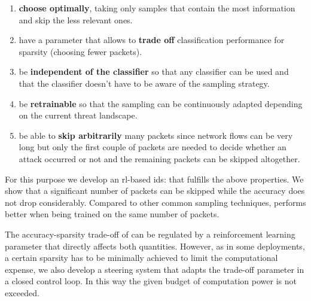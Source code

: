 \documentclass[conference]{IEEEtran}
\begin{document}
\begin{enumerate}
\item \textbf{choose optimally}, taking only samples that contain the most information and skip the less relevant ones.
\item have a parameter that allows to \textbf{trade off} classification performance for sparsity (choosing fewer packets).
\item be \textbf{independent of the classifier} so that any classifier can be used and that the classifier doesn't have to be aware of the sampling strategy.
\item be \textbf{retrainable} so that the sampling can be continuously adapted depending on the current threat landscape.
\item be able to \textbf{skip arbitrarily} many packets since network flows can be very long but only the first couple of packets are needed to decide whether an attack occurred or not and the remaining packets can be skipped altogether.
\end{enumerate}



For this purpose we develop an \gls{rl}-based \gls{ids}: \textit{\ours{}} that fulfills the above properties. We show that a significant number of packets can be skipped while the accuracy does not drop
considerably. Compared to other common sampling techniques, \ours{} performs better when being trained on the same number of packets.


The accuracy-sparsity trade-off of \ours{} can be regulated by a reinforcement learning parameter that directly affects both quantities. However, as in some deployments, a certain sparsity has to be minimally achieved to limit the computational expense, we also develop a steering system that adapts the trade-off parameter in a closed control loop. In this way the given budget of computation power is not exceeded.
\end{document}
